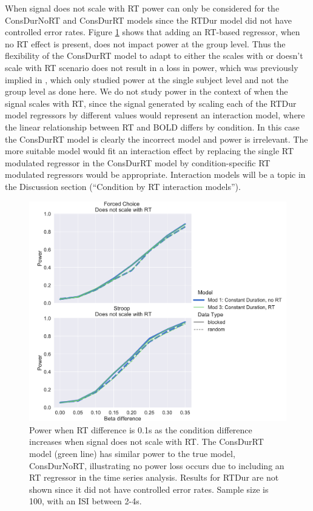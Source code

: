 \documentclass[titlepage,12pt] {article}
\begin{document}
When signal does not scale with RT power can only be considered for the ConsDurNoRT and ConsDurRT models since the RTDur model did not have controlled error rates. Figure \ref{fig:power_rtdiff}  shows that adding an RT-based regressor, when no RT effect is present, does not impact power at the group level.  Thus the flexibility of the ConsDurRT model to adapt to either the scales with or doesn't scale with RT scenario does not result in a loss in power, which was previously implied in \citet{grinband_detection_2008}, which only studied power at the single subject level and not the group level as done here.  We do not study power in the context of when the signal scales with RT, since the signal generated by scaling each of the RTDur model regressors by different values would represent an interaction model, where the linear relationship between RT and BOLD differs by condition.  In this case the ConsDurRT model is clearly the incorrect model and power is irrelevant.  The more suitable model would fit an interaction effect by replacing the single RT modulated regressor in the ConsDurRT model by condition-specific RT modulated regressors would be appropriate.  Interaction models will be a topic in the Discussion section (``Condition by RT interaction models'').



\begin{figure}[h!]
  \centering
   \includegraphics[width=5in]{Figures/power_24_rtdiff_1.pdf}
   \caption{Power when RT difference is 0.1s as the condition difference increases when signal does not scale with RT. The ConsDurRT model (green line) has similar power to the true model, ConsDurNoRT, illustrating no power loss occurs due to including an RT regressor in the time series analysis. Results for RTDur are not shown since it did not have controlled error rates.   Sample size is 100, with an ISI between 2-4s. }
  \label{fig:power_rtdiff}
\end{figure}
\end{document}
